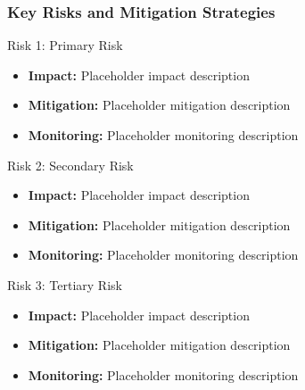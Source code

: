 \begin{frame}
\frametitle{Key Risks and Mitigation Strategies}
\begin{block}{Risk 1: Primary Risk}
\begin{itemize}
\item \textbf{Impact:} Placeholder impact description
\item \textbf{Mitigation:} Placeholder mitigation description
\item \textbf{Monitoring:} Placeholder monitoring description
\end{itemize}
\end{block}

\begin{block}{Risk 2: Secondary Risk}
\begin{itemize}
\item \textbf{Impact:} Placeholder impact description
\item \textbf{Mitigation:} Placeholder mitigation description
\item \textbf{Monitoring:} Placeholder monitoring description
\end{itemize}
\end{block}

\begin{block}{Risk 3: Tertiary Risk}
\begin{itemize}
\item \textbf{Impact:} Placeholder impact description
\item \textbf{Mitigation:} Placeholder mitigation description
\item \textbf{Monitoring:} Placeholder monitoring description
\end{itemize}
\end{block}
\end{frame}

